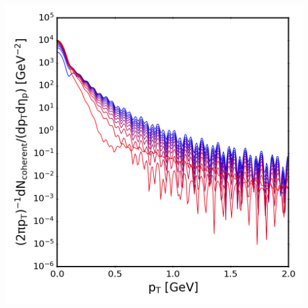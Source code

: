 {\begin{minipage}{\linewidth}
{\begin{minipage}{0.4\linewidth}
                \includegraphics[width=\linewidth]{code/C++/DCCspec/data/images/spectra_real_consteps_20240826_143151_m398_spec.png}        
            \end{minipage}
        }
        \label{fig:SpecRealConstEps_m398}
    \end{minipage}
}

